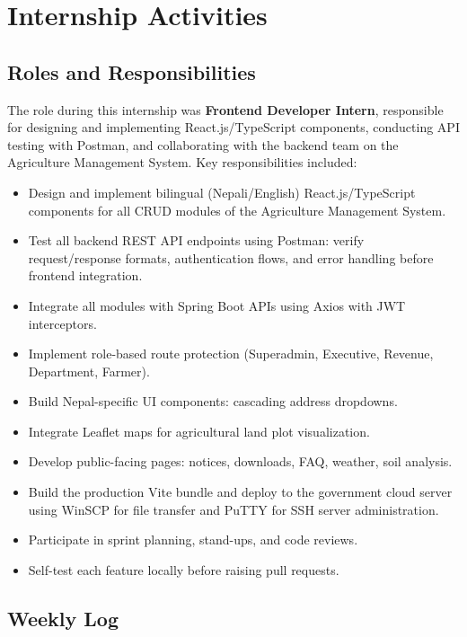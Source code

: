 \documentclass[12pt,a4paper]{report}
\begin{document}
\chapter{Internship Activities}

\section{Roles and Responsibilities}

The role during this internship was \textbf{Frontend Developer Intern}, responsible for
designing and implementing React.js/TypeScript components, conducting API testing with
Postman, and collaborating with the backend team on the Agriculture Management System.
Key responsibilities included:

\begin{itemize}
  \item Design and implement bilingual (Nepali/English) React.js/TypeScript components
        for all CRUD modules of the Agriculture Management System.
  \item Test all backend REST API endpoints using Postman: verify request/response
        formats, authentication flows, and error handling before frontend integration.
  \item Integrate all modules with Spring Boot APIs using Axios with JWT interceptors.
  \item Implement role-based route protection (Superadmin, Executive, Revenue, Department, Farmer).
  \item Build Nepal-specific UI components: cascading address dropdowns.
  \item Integrate Leaflet maps for agricultural land plot visualization.
  \item Develop public-facing pages: notices, downloads, FAQ, weather, soil analysis.
  \item Build the production Vite bundle and deploy to the government cloud server
        using WinSCP for file transfer and PuTTY for SSH server administration.
  \item Participate in sprint planning, stand-ups, and code reviews.
  \item Self-test each feature locally before raising pull requests.
\end{itemize}
\newpage
\section{Weekly Log}
\end{document}
